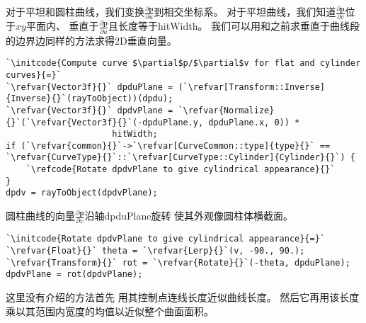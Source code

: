 对于平坦和圆柱曲线，我们变换$\displaystyle\frac{\partial \bm p}{\partial u}$到相交坐标系。
对于平坦曲线，我们知道$\displaystyle\frac{\partial \bm p}{\partial v}$位于$xy$平面内、
垂直于$\displaystyle\frac{\partial \bm p}{\partial u}$且长度等于{\ttfamily hitWidth}。
我们可以用和之前求垂直于曲线段的边界边同样的方法求得2D垂直向量。
\begin{lstlisting}
`\initcode{Compute curve $\partial$p/$\partial$v for flat and cylinder curves}{=}`
`\refvar{Vector3f}{}` dpduPlane = (`\refvar[Transform::Inverse]{Inverse}{}`(rayToObject))(dpdu);
`\refvar{Vector3f}{}` dpdvPlane = `\refvar{Normalize}{}`(`\refvar{Vector3f}{}`(-dpduPlane.y, dpduPlane.x, 0)) *
                     hitWidth;
if (`\refvar{common}{}`->`\refvar[CurveCommon::type]{type}{}` == `\refvar{CurveType}{}`::`\refvar[CurveType::Cylinder]{Cylinder}{}`) {
    `\refcode{Rotate dpdvPlane to give cylindrical appearance}{}`
}
dpdv = rayToObject(dpdvPlane);
\end{lstlisting}

圆柱曲线的向量$\displaystyle\frac{\partial \bm p}{\partial v}$沿轴{\ttfamily dpduPlane}旋转
使其外观像圆柱体横截面。
\begin{lstlisting}
`\initcode{Rotate dpdvPlane to give cylindrical appearance}{=}`
`\refvar{Float}{}` theta = `\refvar{Lerp}{}`(v, -90., 90.);
`\refvar{Transform}{}` rot = `\refvar{Rotate}{}`(-theta, dpduPlane);
dpdvPlane = rot(dpdvPlane);
\end{lstlisting}

这里没有介绍的方法首先
用其控制点连线长度近似曲线长度。
然后它再用该长度乘以其范围内宽度的均值以近似整个曲面面积。